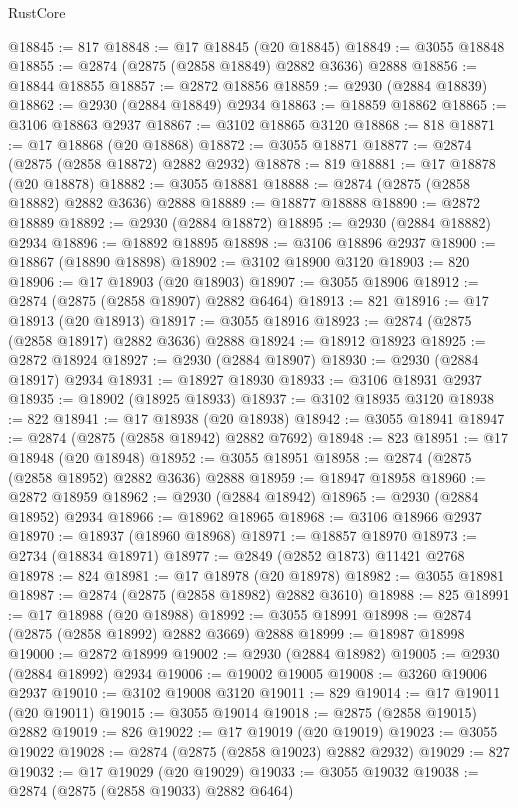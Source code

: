 \begin{lexlean}{RustCore}
\begin{coremodule}
@18845 := 817
@18848 := @17 @18845 (@20 @18845)
@18849 := @3055 @18848
@18855 := @2874 (@2875 (@2858 @18849) @2882 @3636) @2888
@18856 := @18844 @18855
@18857 := @2872 @18856
@18859 := @2930 (@2884 @18839)
@18862 := @2930 (@2884 @18849) @2934
@18863 := @18859 @18862
@18865 := @3106 @18863 @2937
@18867 := @3102 @18865 @3120
@18868 := 818
@18871 := @17 @18868 (@20 @18868)
@18872 := @3055 @18871
@18877 := @2874 (@2875 (@2858 @18872) @2882 @2932)
@18878 := 819
@18881 := @17 @18878 (@20 @18878)
@18882 := @3055 @18881
@18888 := @2874 (@2875 (@2858 @18882) @2882 @3636) @2888
@18889 := @18877 @18888
@18890 := @2872 @18889
@18892 := @2930 (@2884 @18872)
@18895 := @2930 (@2884 @18882) @2934
@18896 := @18892 @18895
@18898 := @3106 @18896 @2937
@18900 := @18867 (@18890 @18898)
@18902 := @3102 @18900 @3120
@18903 := 820
@18906 := @17 @18903 (@20 @18903)
@18907 := @3055 @18906
@18912 := @2874 (@2875 (@2858 @18907) @2882 @6464)
@18913 := 821
@18916 := @17 @18913 (@20 @18913)
@18917 := @3055 @18916
@18923 := @2874 (@2875 (@2858 @18917) @2882 @3636) @2888
@18924 := @18912 @18923
@18925 := @2872 @18924
@18927 := @2930 (@2884 @18907)
@18930 := @2930 (@2884 @18917) @2934
@18931 := @18927 @18930
@18933 := @3106 @18931 @2937
@18935 := @18902 (@18925 @18933)
@18937 := @3102 @18935 @3120
@18938 := 822
@18941 := @17 @18938 (@20 @18938)
@18942 := @3055 @18941
@18947 := @2874 (@2875 (@2858 @18942) @2882 @7692)
@18948 := 823
@18951 := @17 @18948 (@20 @18948)
@18952 := @3055 @18951
@18958 := @2874 (@2875 (@2858 @18952) @2882 @3636) @2888
@18959 := @18947 @18958
@18960 := @2872 @18959
@18962 := @2930 (@2884 @18942)
@18965 := @2930 (@2884 @18952) @2934
@18966 := @18962 @18965
@18968 := @3106 @18966 @2937
@18970 := @18937 (@18960 @18968)
@18971 := @18857 @18970
@18973 := @2734 (@18834 @18971)
@18977 := @2849 (@2852 @1873) @11421 @2768
@18978 := 824
@18981 := @17 @18978 (@20 @18978)
@18982 := @3055 @18981
@18987 := @2874 (@2875 (@2858 @18982) @2882 @3610)
@18988 := 825
@18991 := @17 @18988 (@20 @18988)
@18992 := @3055 @18991
@18998 := @2874 (@2875 (@2858 @18992) @2882 @3669) @2888
@18999 := @18987 @18998
@19000 := @2872 @18999
@19002 := @2930 (@2884 @18982)
@19005 := @2930 (@2884 @18992) @2934
@19006 := @19002 @19005
@19008 := @3260 @19006 @2937
@19010 := @3102 @19008 @3120
@19011 := 829
@19014 := @17 @19011 (@20 @19011)
@19015 := @3055 @19014
@19018 := @2875 (@2858 @19015) @2882
@19019 := 826
@19022 := @17 @19019 (@20 @19019)
@19023 := @3055 @19022
@19028 := @2874 (@2875 (@2858 @19023) @2882 @2932)
@19029 := 827
@19032 := @17 @19029 (@20 @19029)
@19033 := @3055 @19032
@19038 := @2874 (@2875 (@2858 @19033) @2882 @6464)

\end{coremodule}
\end{lexlean}
